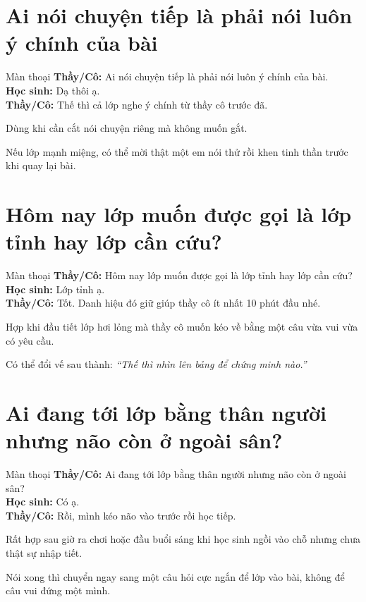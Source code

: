 \section{Ai nói chuyện tiếp là phải nói luôn ý chính của bài}
\begin{manthoai}{Màn thoại}
\textbf{Thầy/Cô:} Ai nói chuyện tiếp là phải nói luôn ý chính của bài.\\
\textbf{Học sinh:} Dạ thôi ạ.\\
\textbf{Thầy/Cô:} Thế thì cả lớp nghe ý chính từ thầy cô trước đã.
\end{manthoai}
\begin{dungkhinào}
Dùng khi cần cắt nói chuyện riêng mà không muốn gắt.
\end{dungkhinào}
\begin{nhipthem}
Nếu lớp mạnh miệng, có thể mời thật một em nói thử rồi khen tinh thần trước khi quay lại bài.
\end{nhipthem}
\ngancach

\section{Hôm nay lớp muốn được gọi là lớp tỉnh hay lớp cần cứu?}
\begin{manthoai}{Màn thoại}
\textbf{Thầy/Cô:} Hôm nay lớp muốn được gọi là lớp tỉnh hay lớp cần cứu?\\
\textbf{Học sinh:} Lớp tỉnh ạ.\\
\textbf{Thầy/Cô:} Tốt. Danh hiệu đó giữ giúp thầy cô ít nhất 10 phút đầu nhé.
\end{manthoai}
\begin{dungkhinào}
Hợp khi đầu tiết lớp hơi lỏng mà thầy cô muốn kéo về bằng một câu vừa vui vừa có yêu cầu.
\end{dungkhinào}
\begin{nhipthem}
Có thể đổi vế sau thành: \textit{``Thế thì nhìn lên bảng để chứng minh nào.''}
\end{nhipthem}
\ngancach

\section{Ai đang tới lớp bằng thân người nhưng não còn ở ngoài sân?}
\begin{manthoai}{Màn thoại}
\textbf{Thầy/Cô:} Ai đang tới lớp bằng thân người nhưng não còn ở ngoài sân?\\
\textbf{Học sinh:} Có ạ.\\
\textbf{Thầy/Cô:} Rồi, mình kéo não vào trước rồi học tiếp.
\end{manthoai}
\begin{dungkhinào}
Rất hợp sau giờ ra chơi hoặc đầu buổi sáng khi học sinh ngồi vào chỗ nhưng chưa thật sự nhập tiết.
\end{dungkhinào}
\begin{nhipthem}
Nói xong thì chuyển ngay sang một câu hỏi cực ngắn để lớp vào bài, không để câu vui đứng một mình.
\end{nhipthem}
